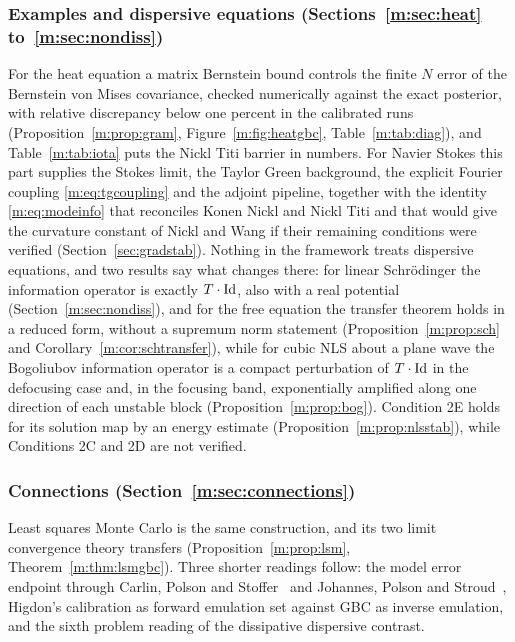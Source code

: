 \subsubsection{Examples and dispersive equations (Sections~\ref{m:sec:heat} to~\ref{m:sec:nondiss})} For the heat equation a matrix Bernstein bound controls the finite $N$ error of the Bernstein von Mises covariance, checked numerically against the exact posterior, with relative discrepancy below one percent in the calibrated runs (Proposition~\ref{m:prop:gram}, Figure~\ref{m:fig:heatgbc}, Table~\ref{m:tab:diag}), and Table~\ref{m:tab:iota} puts the Nickl Titi barrier in numbers. For Navier Stokes this part supplies the Stokes limit, the Taylor Green background, the explicit Fourier coupling \eqref{m:eq:tgcoupling} and the adjoint pipeline, together with the identity \eqref{m:eq:modeinfo} that reconciles Konen Nickl and Nickl Titi and that would give the curvature constant of Nickl and Wang if their remaining conditions were verified (Section~\ref{sec:gradstab}). Nothing in the framework treats dispersive equations, and two results say what changes there: for linear Schr\"odinger the information operator is exactly $T\cdot\operatorname{Id}$, also with a real potential (Section~\ref{m:sec:nondiss}), and for the free equation the transfer theorem holds in a reduced form, without a supremum norm statement (Proposition~\ref{m:prop:sch} and Corollary~\ref{m:cor:schtransfer}), while for cubic NLS about a plane wave the Bogoliubov information operator is a compact perturbation of $T\cdot\operatorname{Id}$ in the defocusing case and, in the focusing band, exponentially amplified along one direction of each unstable block (Proposition~\ref{m:prop:bog}). Condition 2E holds for its solution map by an energy estimate (Proposition~\ref{m:prop:nlsstab}), while Conditions 2C and 2D are not verified.

\subsubsection{Connections (Section~\ref{m:sec:connections})} Least squares Monte Carlo is the same construction, and its two limit convergence theory transfers (Proposition~\ref{m:prop:lsm}, Theorem~\ref{m:thm:lsmgbc}). Three shorter readings follow: the model error endpoint through Carlin, Polson and Stoffer~\cite{cps1992} and Johannes, Polson and Stroud~\cite{jps2009}, Higdon's calibration as forward emulation set against GBC as inverse emulation, and the sixth problem reading of the dissipative dispersive contrast.

